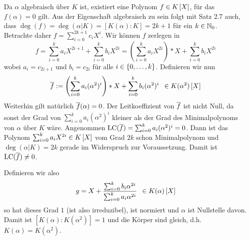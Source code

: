 \begin{exercisePage}
    Da $\alpha$ algebraisch über $K$ ist, existiert eine Polynom $f \in \polynom[K]$, für das $f(\alpha) = 0$ gilt. Aus der Eigenschaft algebraisch zu sein folgt mit Satz 2.7 auch, dass $\deg(f) = \deg(\alpha | K) = [K(\alpha) : K] = 2k + 1$ für ein $k \in \mathbb{N}_0$. Betrachte daher $f = \sum_{i=0}^{2k+1} c_i X^i$.  Wir können $f$ zerlegen in 
    \begin{equation*}
            f = \sum_{i=0}^k a_i X^{2i + 1} + \sum_{i=0}^k b_i X^{2i} 
            = \left( \sum_{i=0}^k a_i X^{2i} \right) * X + \sum_{i=0}^k b_i X^{2i}
    \end{equation*}
    wobei $a_i = c_{2i+1}$ und $b_i = c_{2i}$ für alle $i \in \left\{ 0, \dots , k \right\}$.
    Definieren wir nun
    \begin{equation*}
        \quer{f} \defeq \left( \sum_{i=0}^k a_i (\alpha^2)^i \right) * X + \sum_{i=0}^k b_i (\alpha^2)^i \enskip \in \polynom[K(\alpha^2)] \label{eq: 1_9_polynomueberalpha2}
    \end{equation*}
    Weiterhin gilt natürlich $\overline{f}(\alpha) = 0$. Der Leitkoeffizient von $\overline{f}$ ist nicht Null, da sonst der Grad von $\sum_{i=0}^k a_i (\alpha^2)^i$ kleiner als der Grad des Minimalpolynoms von $\alpha$ über $K$ wäre. Angenommen $\operatorname{LC}(\overline{f}) = \sum_{i=0}^k a_i (\alpha^2)^i = 0$. Dann ist das Polynom $\sum_{i=0}^k a_i X^{2i} \in \polynom[K]$ vom Grad $2k$ schon Minimalpolynom und $\deg(\alpha | K) = 2k$ gerade im Widerspruch zur Voraussetzung. Damit ist $\operatorname{LC}(\overline{f}) \neq 0$.
    
    Definieren wir also
    \begin{equation*}
        g = X + \frac{\sum_{i=0}^k b_i \alpha^{2i}}{\sum_{i=0}^k a_i \alpha^{2i}} \enskip \in \polynom[K(\alpha)]
    \end{equation*}
    so hat dieses Grad $1$ (ist also irreduzibel), ist normiert und $\alpha$ ist Nullstelle davon. Damit ist $[K(\alpha) : K(\alpha^2)] = 1$ und die Körper sind gleich, d.h. $K(\alpha) = K(\alpha^2)$.

\end{exercisePage}